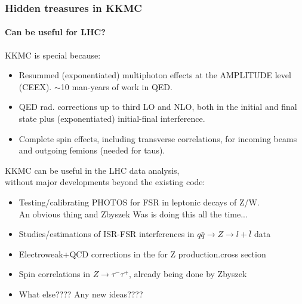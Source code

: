 \documentclass{beamer}
\begin{document}
\begin{frame}[fragile]
\frametitle{\bf Hidden treasures in KKMC}
\framesubtitle{Can be useful for LHC?}
\small
KKMC is special because:
\begin{itemize}
\item
Resummed (exponentiated) multiphoton effects at the AMPLITUDE level (CEEX).
$\sim$10 man-years of work in QED.
\item
QED rad. corrections up to third LO and NLO, both in the initial
and final state plus (exponentiated) initial-final interference.
\item
Complete spin effects, including transverse correlations, for incoming beams
and outgoing femions (needed for taus).
\end{itemize}

\footnotesize
KKMC can be useful in the LHC data analysis,\\
without major developments beyond the existing code:
\begin{itemize}
\item
Testing/calibrating PHOTOS for FSR in leptonic decays of Z/W.\\
An obvious thing and Zbyszek Was is doing this all the time...
\item
Studies/estimations of ISR-FSR interferences in 
$q\bar{q} \to Z \to l+\bar{l}$ data
\item
Electroweak+QCD corrections in the for Z production.cross section
\item
Spin correlations in $Z \to \tau^-\tau^+$, already being done by Zbyszek
\item
What else???? Any new ideas????
\end{itemize}

\end{frame}
\end{document}
